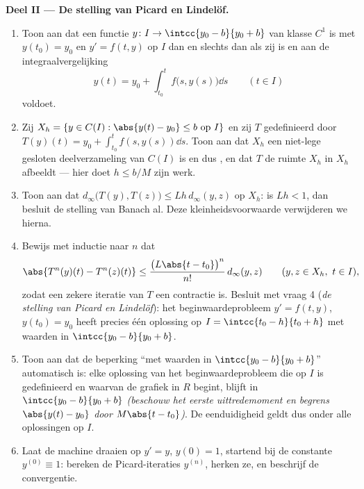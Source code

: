 \begin{problem}
\medskip
\noindent\textbf{Deel II --- De stelling van Picard en Lindelöf.}
\begin{enumerate}[resume]
  \item Toon aan dat een functie $y \colon I \to \intcc{y_0 -
        b}{y_0 + b}$ van klasse $C^1$ is met $y(t_0) = y_0$ en $y'
        = f(t, y)$ op $I$ dan en slechts dan als zij  is en
        aan de integraalvergelijking
        \[
        y(t) = y_0 + \int_{t_0}^{t} f\bigl(s, y(s)\bigr)\dd s
        \qquad (t \in I)
        \]
        voldoet.
  \item Zij $X_h = \{y \in C(I) : \abs{y(t) - y_0} \leq b
        \text{ op } I\}$ en zij $T$ gedefinieerd door $T(y)(t) =
        y_0 + \int_{t_0}^{t}f(s, y(s))\dd s$. Toon aan dat $X_h$
        een niet-lege gesloten deelverzameling van $C(I)$ is en
        dus , en dat $T$ de ruimte $X_h$ in $X_h$
        afbeeldt --- hier doet $h \leq b/M$ zijn werk.
  \item Toon aan dat $d_\infty\bigl(T(y), T(z)\bigr) \leq
        Lh\,d_\infty(y, z)$ op $X_h$: is $Lh < 1$, dan besluit de
        stelling van Banach al. Deze kleinheidsvoorwaarde
        verwijderen we hierna.
  \item Bewijs met inductie naar $n$ dat
        \[
        \abs{T^n(y)(t) - T^n(z)(t)} \leq
        \frac{\bigl(L\abs{t - t_0}\bigr)^n}{n!}\,
        d_\infty(y, z) \qquad (y, z \in X_h,\ t \in I),
        \]
        zodat een zekere iteratie van $T$ een contractie is.
        Besluit met vraag 4 (\emph{de stelling van Picard en
        Lindelöf}): het beginwaardeprobleem $y' = f(t,y)$,
        $y(t_0) = y_0$ heeft precies één oplossing op $I =
        \intcc{t_0 - h}{t_0 + h}$ met waarden in $\intcc{y_0 -
        b}{y_0 + b}$.
  \item Toon aan dat de beperking ``met waarden in $\intcc{y_0 -
        b}{y_0 + b}$'' automatisch is: elke oplossing van het
        beginwaardeprobleem die op $I$ is gedefinieerd en waarvan
        de grafiek in $R$ begint, blijft in $\intcc{y_0 - b}{y_0 +
        b}$ \emph{(beschouw het eerste uittredemoment en begrens
        $\abs{y(t) - y_0}$ door $M\abs{t - t_0}$)}. De
        eenduidigheid geldt dus onder alle oplossingen op $I$.
  \item Laat de machine draaien op $y' = y$, $y(0) = 1$, startend
        bij de constante $y^{(0)} \equiv 1$: bereken de
        Picard-iteraties $y^{(n)}$, herken ze, en beschrijf de
        convergentie.
\end{enumerate}


\end{problem}
